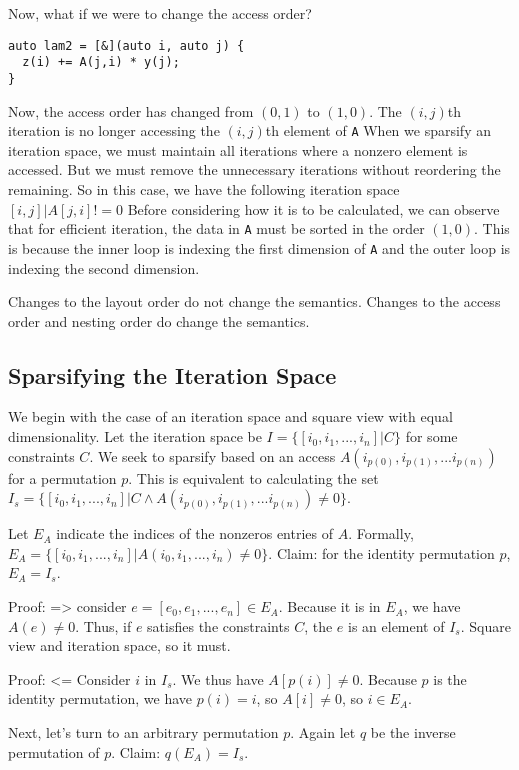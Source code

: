 Now, what if we were to change the access order? 
\begin{lstlisting}
auto lam2 = [&](auto i, auto j) {
  z(i) += A(j,i) * y(j);
}
\end{lstlisting}
Now, the access order has changed from $(0,1)$ to $(1,0)$. 
The $(i,j)$th iteration is no longer accessing the $(i,j)$th element of \verb.A. 
When we sparsify an iteration space, we must maintain all iterations where a nonzero element is accessed. But we must remove the unnecessary iterations without reordering the remaining.
So in this case, we have the following iteration space ${[i,j] | A[j,i] != 0}$
Before considering how it is to be calculated, we can observe that for efficient iteration, the data in \verb.A. must be sorted in the order $(1,0)$. 
This is because the inner loop is indexing the first dimension of \verb.A. and the outer loop is indexing the second dimension. 

Changes to the layout order do not change the semantics. Changes to the access order and nesting order do change the semantics.

\subsection{Sparsifying the Iteration Space}

We begin with the case of an iteration space and square view with equal dimensionality.
Let the iteration space be $I = \{[i_0,i_1,...,i_n] | C\}$ for some constraints $C$.
We seek to sparsify based on an access $A(i_{p(0)},i_{p(1)},...i_{p(n)})$ for a permutation $p$.
This is equivalent to calculating the set $I_s = \{[i_0,i_1,...,i_n] | C \land A(i_{p(0)},i_{p(1)},...i_{p(n)}) \neq 0\}$.

Let $E_A$ indicate the indices of the nonzeros entries of $A$. 
Formally, $E_A = \{[i_0,i_1,...,i_n] | A(i_0,i_1,...,i_n) \neq 0\}$.
Claim: for the identity permutation $p$, $E_A = I_s$.

Proof: => 
consider $e = [e_0,e_1,...,e_n] \in E_A$. 
Because it is in $E_A$, we have $A(e) \neq 0$.
Thus, if $e$ satisfies the constraints $C$, the $e$ is an element of $I_s$.
Square view and iteration space, so it must.

Proof: <=
Consider $i$ in $I_s$. 
We thus have $A[p(i)] \neq 0$.
Because $p$ is the identity permutation, we have $p(i) = i$, so $A[i] \neq 0$, so $i \in E_A$.

Next, let's turn to an arbitrary permutation $p$. 
Again let $q$ be the inverse permutation of $p$. 
Claim: $q(E_A) = I_s$.


